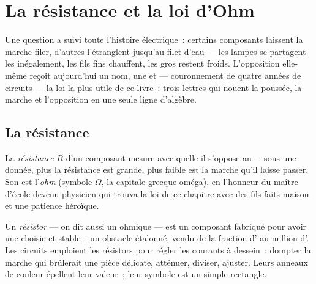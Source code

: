 \chapter{La résistance et la loi d'Ohm}\label{ch:g8:ohms-law}

Une question a suivi toute l'histoire électrique~: certains composants
laissent la marche filer, d'autres l'étranglent jusqu'au filet d'eau
--- les lampes se partagent les  inégalement, les fils fins
chauffent, les gros restent froids. L'opposition elle-même reçoit
aujourd'hui un nom, une  et --- couronnement de quatre années de
circuits --- la loi la plus utile de ce livre~: trois lettres qui
nouent la poussée, la marche et l'opposition en une seule ligne
d'algèbre.

\section{La résistance}

\begin{definition}[Résistance]\label{def:g8:ohms-law:resistance}
La \emph{résistance} $R$ d'un composant mesure avec
quelle  il s'oppose au ~: sous une 
donnée, plus la résistance est grande, plus faible est la marche
qu'il laisse passer. Son  est l'\emph{ohm} (symbole
$\Omega$, la capitale grecque oméga), en l'honneur du
maître d'école devenu physicien qui trouva la loi de ce chapitre avec
des fils faits maison et une patience héroïque.
\end{definition}

\begin{definition}[Résistor]\label{def:g8:ohms-law:resistor}
Un \emph{résistor} --- on dit aussi un 
ohmique --- est un composant fabriqué pour avoir une 
choisie et stable~: un obstacle étalonné, vendu de la fraction d'
au million d'. Les circuits emploient les résistors pour régler
les courants à dessein~: dompter la marche qui brûlerait une pièce
délicate, atténuer, diviser, ajuster. Leurs anneaux de couleur
épellent leur valeur~; leur symbole est un simple rectangle.
\end{definition}

